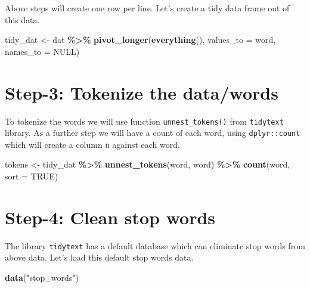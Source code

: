 \documentclass[
]{book}
\newenvironment{Shaded}{\begin{snugshade}}{\end{snugshade}}
\newcommand{\AttributeTok}[1]{\textcolor[rgb]{0.13,0.29,0.53}{#1}}
\newcommand{\ConstantTok}[1]{\textcolor[rgb]{0.56,0.35,0.01}{#1}}
\newcommand{\FunctionTok}[1]{\textcolor[rgb]{0.13,0.29,0.53}{\textbf{#1}}}
\newcommand{\NormalTok}[1]{#1}
\newcommand{\OtherTok}[1]{\textcolor[rgb]{0.56,0.35,0.01}{#1}}
\newcommand{\SpecialCharTok}[1]{\textcolor[rgb]{0.81,0.36,0.00}{\textbf{#1}}}
\newcommand{\StringTok}[1]{\textcolor[rgb]{0.31,0.60,0.02}{#1}}
\begin{document}
Above steps will create one row per line. Let's create a tidy data frame out of this data.

\begin{Shaded}
\begin{Highlighting}[]
\NormalTok{tidy\_dat }\OtherTok{\textless{}{-}}\NormalTok{ dat }\SpecialCharTok{\%\textgreater{}\%} 
  \FunctionTok{pivot\_longer}\NormalTok{(}\FunctionTok{everything}\NormalTok{(), }\AttributeTok{values\_to =} \StringTok{\textquotesingle{}word\textquotesingle{}}\NormalTok{, }\AttributeTok{names\_to =} \ConstantTok{NULL}\NormalTok{)}
\end{Highlighting}
\end{Shaded}

\hypertarget{step-3-tokenize-the-datawords}{%
\section{Step-3: Tokenize the data/words}\label{step-3-tokenize-the-datawords}}

To tokenize the words we will use function \texttt{unnest\_tokens()} from \texttt{tidytext} library. As a further step we will have a count of each word, using \texttt{dplyr::count} which will create a column \texttt{n} against each word.

\begin{Shaded}
\begin{Highlighting}[]
\NormalTok{tokens }\OtherTok{\textless{}{-}}\NormalTok{ tidy\_dat }\SpecialCharTok{\%\textgreater{}\%} 
  \FunctionTok{unnest\_tokens}\NormalTok{(word, word) }\SpecialCharTok{\%\textgreater{}\%} 
  \FunctionTok{count}\NormalTok{(word, }\AttributeTok{sort =} \ConstantTok{TRUE}\NormalTok{) }
\end{Highlighting}
\end{Shaded}

\hypertarget{step-4-clean-stop-words}{%
\section{Step-4: Clean stop words}\label{step-4-clean-stop-words}}

The library \texttt{tidytext} has a default database which can eliminate stop words from above data. Let's load this default stop words data.

\begin{Shaded}
\begin{Highlighting}[]
\FunctionTok{data}\NormalTok{(}\StringTok{"stop\_words"}\NormalTok{)}
\end{Highlighting}
\end{Shaded}
\end{document}
